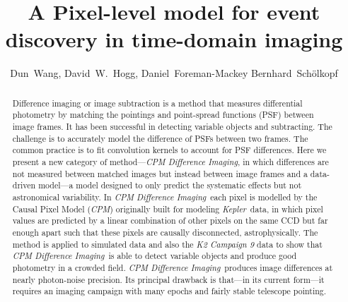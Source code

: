 \documentclass[12pt, preprint]{aastex}
\newcommand{\project}[1]{\textsl{#1}}
\newcommand{\cpm}{\project{CPM}}
\newcommand{\cpmdiff}{\project{CPM Difference Imaging}}
\newcommand{\kepler}{\project{Kepler}}
\begin{document}
\title{A Pixel-level model for event discovery in time-domain imaging}
\author{%
  Dun~Wang\altaffilmark{\ref{CCPP}},
  David~W.~Hogg\altaffilmark{\ref{CCPP},\ref{CDS},\ref{MPIA},\ref{email}},
  Daniel~Foreman-Mackey\altaffilmark{\ref{UW},\ref{SF}}
  Bernhard~Sch\"olkopf\altaffilmark{\ref{MPIIS}}
  }
\setcounter{address}{1}


\begin{abstract}
Difference imaging or image subtraction is a method that measures differential photometry by matching the pointings and point-spread functions (PSF) between image frames. 
It has been successful in detecting variable objects and subtracting. The challenge is to accurately model the difference of PSFs between two frames. The common practice is to fit convolution kernels to account for PSF differences.
Here we present a new category of method---\cpmdiff, in which differences are not measured between matched images but instead between image frames and a data-driven model---a model designed to only predict the systematic effects but not astronomical variability. 
In \cpmdiff\ each pixel is modelled by the Causal Pixel Model (\cpm) originally built for modeling \kepler\ data, in which pixel values are predicted by a linear combination of other pixels on the same CCD but far enough apart such that these pixels are causally disconnected, astrophysically. 
The method is applied to  simulated data and also the \project{K2 Campaign 9} data to show that \cpmdiff\ is able to detect variable objects and produce good photometry in a crowded field.
\cpmdiff\ produces image differences at nearly photon-noise precision. 
Its principal drawback is that---in its current form---it requires an imaging campaign with many epochs and fairly stable telescope pointing.

\end{abstract}
\end{document}
